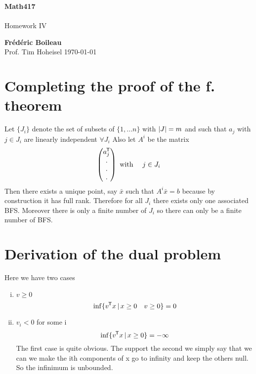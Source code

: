 \documentclass{article}
\DeclarePairedDelimiter{\abs}{\lvert}{\rvert}
\newcommand*{\tran}{^{\mkern-1.5mu\mathsf{T}}}%
\begin{document}
	\begin{titlepage}
		\begin{center}
			\vspace*{1cm}
			\textbf{Math417}\\
			\\
			\vspace{0.5cm}
			Homework IV
			
			\vspace{1.5cm}
			
			\textbf{Frédéric Boileau}\\
			\vspace{2cm}
			Prof. 
			Tim Hoheisel
			\vfill
			\today
			\thispagestyle{empty}
		\end{center}
	\end{titlepage}
	\newpage
	\tableofcontents
	\thispagestyle{empty}
	\clearpage
	
	\section{Completing the proof of the f. theorem}
	
	Let $\{J_i\}$ denote the set of subsets of $\{1,...n\}$ with $\abs{J}=m$ and such that $a_j$ with $j\in J_i$ are linearly independent $\forall J_i$
	Also let $A^i$ be the matrix
	\begin{equation*}
	\begin{pmatrix}
	a_j\tran\\.\\.\\.	\end{pmatrix} \text{ with } \quad j \in J_i
	\end{equation*}
	Then there exists a unique point, say $\bar x$ such that $A^i\bar x=b$ because by construction it has full rank. Therefore for all $J_i$ there exists only one associated BFS. Moreover there is only a finite number of $J_i$ so there can only be a finite number of BFS.
	
	\section{Derivation of the dual problem}
	
	Here we have two cases
	\begin{enumerate}[i)]
		\item $v\ge 0$
		\begin{equation*}
			\inf \{v\tran x \,\vert \, x\ge 0 \quad v \ge 0 \} = 0
		\end{equation*}
		\item $v_i < 0$ for some i
		\begin{equation*}
			\inf \{v\tran x \, \vert \, x\ge 0 \} = - \infty
		\end{equation*}
		The first case is quite obvious. The support the second we simply say that we can we make the ith components of x go to infinity and keep the others null. So the infinimum is unbounded.
	\end{enumerate}
	\clearpage
\end{document}
